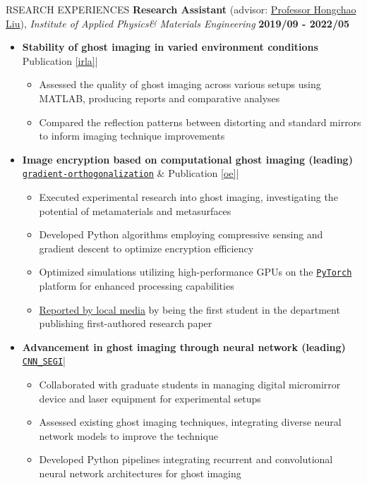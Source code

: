 \documentclass[10pt]{article} %
\begin{document}
\begin{section}{RSEARCH EXPERIENCES}
\textbf{Research Assistant} (advisor: \href{mailto:hcliu@um.edu.mo}{Professor Hongchao Liu}), \textit{Institute of Applied Physics\& Materials Engineering} \hfill \textbf{2019/09 - 2022/05} 
\begin{itemize}[leftmargin=1.5em]
    \item \textbf{Stability of ghost imaging in varied environment conditions} 
    \hfill {\footnotesize Publication \ref{irla}}| %
    \begin{itemize}[leftmargin=1.5em]
        \item Assessed the quality of ghost imaging across various setups using MATLAB, producing reports and comparative analyses
        \item Compared the reflection patterns between distorting and standard mirrors to inform imaging technique improvements
    \end{itemize}
    \item \textbf{Image encryption based on computational ghost imaging (leading)} 
    \hfill {\footnotesize \href{https://github.com/Chisen-Lupus/gradient-orthogonalization}{\texttt{gradient-orthogonalization}} \& Publication \ref{oe}}| %
    \begin{itemize}[leftmargin=1.5em]
        \item Executed experimental research into ghost imaging, investigating the potential of metamaterials and metasurfaces
        \item Developed Python algorithms employing compressive sensing and gradient descent to optimize encryption efficiency
        \item Optimized simulations utilizing high-performance GPUs on the \href{https://pytorch.org/}{\texttt{PyTorch}} platform for enhanced processing capabilities
        \item \href{https://www.tdm.com.mo/en/news-detail/683438?isvideo=false&lang=en&category=all}{Reported by local media} by being the first student in the department publishing first-authored research paper
    \end{itemize}
    \item \textbf{Advancement in ghost imaging through neural network (leading)} 
    \hfill {\footnotesize \href{https://github.com/Chisen-Lupus/CNN_SEGI}{\texttt{CNN\_SEGI}}}| %
    \begin{itemize}[leftmargin=1.5em]
        \item Collaborated with graduate students in managing digital micromirror device and laser equipment for experimental setups
        \item Assessed existing ghost imaging techniques, integrating diverse neural network models to improve the technique
        \item Developed Python pipelines integrating recurrent and convolutional neural network architectures for ghost imaging
    \end{itemize}
\end{itemize}


\end{section}
\end{document}
